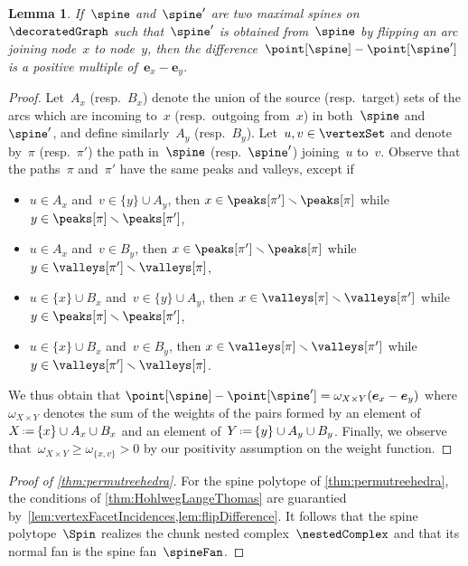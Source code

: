 \documentclass{amsart}
\newtheorem{lemma}[theorem]{Lemma}
\theoremstyle{definition}
\renewcommand{\b}[1]{{\boldsymbol{#1}}} %
\newcommand{\ssm}{\smallsetminus} %
\newcommand{\eqdef}{\mbox{\,\raisebox{0.2ex}{\scriptsize\ensuremath{\mathrm:}}\ensuremath{=}\,}} %
\newcommand{\weight}{\omega} %
\begin{document}
\begin{lemma}
  \label{lem:flipDifference}
  If~$\spine$ and~$\spine'$ are two maximal spines on~$\decoratedGraph$ such that~$\spine'$ is obtained from~$\spine$ by flipping an arc joining node~$x$ to node~$y$, then the difference~$\point[\spine] - \point[\spine']$ is a positive multiple of~$\b{e}_x - \b{e}_y$.
\end{lemma}

\begin{proof}
  Let~$A_x$ (resp.~$B_x$) denote the union of the source (resp.~target) sets of the arcs which are incoming to~$x$ (resp.~outgoing from~$x$) in both~$\spine$ and~$\spine'$, and define similarly~$A_y$ (resp.~$B_y$).
  Let~$u,v \in \vertexSet$ and denote by~$\pi$ (resp.~$\pi'$) the path in~$\spine$ (resp.~$\spine'$) joining~$u$ to~$v$.
  Observe that the paths~$\pi$ and~$\pi'$ have the same peaks and valleys, except if
  \begin{itemize}
    \item $u \in A_x$ and~$v \in \{y\} \cup A_y$, then $x \in \peaks[\pi'] \ssm \peaks[\pi]$ while~$y \in \peaks[\pi] \ssm \peaks[\pi']$,
    \item $u \in A_x$ and~$v \in B_y$, then $x \in \peaks[\pi'] \ssm \peaks[\pi]$ while~$y \in \valleys[\pi'] \ssm \valleys[\pi]$,
    \item $u \in \{x\} \cup B_x$ and~$v \in \{y\} \cup A_y$, then $x \in \valleys[\pi] \ssm \valleys[\pi']$ while~$y \in \peaks[\pi] \ssm \peaks[\pi']$,
    \item $u \in \{x\} \cup B_x$ and~$v \in B_y$, then $x \in \valleys[\pi] \ssm \valleys[\pi']$ while~$y \in \valleys[\pi'] \ssm \valleys[\pi]$.
  \end{itemize}
  We thus obtain that
  \(
    \point[\spine] - \point[\spine'] = \weight_{X \times Y} (\b{e}_x - \b{e}_y)
  \)
  where~$\weight_{X \times Y}$ denotes the sum of the weights of the pairs formed by an element of~$X \eqdef \{x\} \cup A_x \cup B_x$ and an element of~$Y \eqdef \{y\} \cup A_y \cup B_y$.
  Finally, we observe that~$\weight_{X \times Y} \ge \weight_{\{x,v\}} > 0$ by our positivity assumption on the weight function.
\end{proof}

\begin{proof}[Proof of \cref{thm:permutreehedra}]
  For the spine polytope of \cref{thm:permutreehedra}, the conditions of \cref{thm:HohlwegLangeThomas} are guarantied by~\cref{lem:vertexFacetIncidences,lem:flipDifference}.
  It follows that the spine polytope~$\Spin$ realizes the chunk nested complex~$\nestedComplex$ and that its normal fan is the spine fan~$\spineFan$.
\end{proof}
\end{document}
